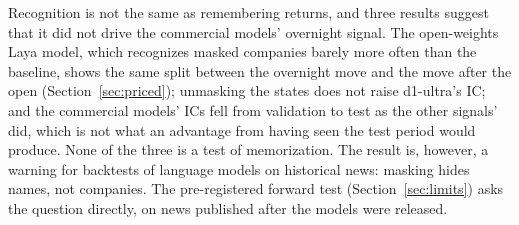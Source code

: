 Recognition is not the same as remembering returns, and three results suggest that it did not drive the
commercial models' overnight signal. The open-weights Laya model, which recognizes masked companies barely more
often than the baseline, shows the same split between the overnight move and the move after the open
(Section~\ref{sec:priced}); unmasking the states does not raise d1-ultra's IC; and the commercial models' ICs fell
from validation to test as the other signals' did, which is not what an advantage from having seen the test
period would produce. None of the three is a test of memorization. The result is, however, a warning for
backtests of language models on historical news: masking hides names, not companies. The pre-registered forward
test (Section~\ref{sec:limits}) asks the question directly, on news published after the models were released.
